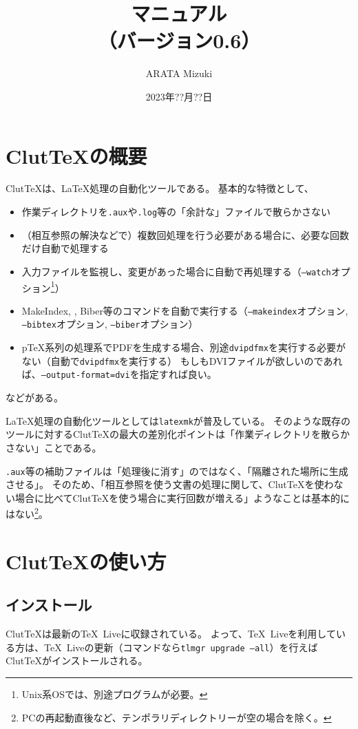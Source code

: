 \documentclass[a4paper]{ltjsreport}
\title{\ClutTeX{}マニュアル\\（バージョン0.6）}%
\author{ARATA Mizuki}
\date{2023年??月??日}
\newcommand\ClutTeX{Clut\TeX}
\begin{document}
\maketitle
\tableofcontents

\chapter{\ClutTeX{}の概要}
\ClutTeX{}は、\LaTeX{}処理の自動化ツールである。
基本的な特徴として、
\begin{itemize}
\item 作業ディレクトリを\texttt{.aux}や\texttt{.log}等の「余計な」ファイルで散らかさない
\item （相互参照の解決などで）複数回処理を行う必要がある場合に、必要な回数だけ自動で処理する
\item 入力ファイルを監視し、変更があった場合に自動で再処理する（\texttt{--watch}オプション\footnote{Unix系OSでは、別途プログラムが必要。}）
\item MakeIndex, \BibTeX, Biber等のコマンドを自動で実行する（\texttt{--makeindex}オプション, \texttt{--bibtex}オプション, \texttt{--biber}オプション）
\item p\TeX 系列の処理系でPDFを生成する場合、別途\texttt{dvipdfmx}を実行する必要がない（自動で\texttt{dvipdfmx}を実行する）
  もしもDVIファイルが欲しいのであれば、\texttt{--output-format=dvi}を指定すれば良い。
\end{itemize}
などがある。

\LaTeX{}処理の自動化ツールとしては\texttt{latexmk}が普及している。
そのような既存のツールに対する\ClutTeX{}の最大の差別化ポイントは「作業ディレクトリを散らかさない」ことである。

\texttt{.aux}等の補助ファイルは「処理後に消す」のではなく、「隔離された場所に生成させる」。
そのため、「相互参照を使う文書の処理に関して、\ClutTeX{}を使わない場合に比べて\ClutTeX{}を使う場合に実行回数が増える」ようなことは基本的にはない\footnote{PCの再起動直後など、テンポラリディレクトリーが空の場合を除く。}。

\chapter{\ClutTeX{}の使い方}
\section{インストール}
\ClutTeX{}は最新の\TeX\ Liveに収録されている。
よって、\TeX\ Liveを利用している方は、\TeX\ Liveの更新（コマンドなら\texttt{tlmgr upgrade --all}）を行えば\ClutTeX{}がインストールされる。
\end{document}
